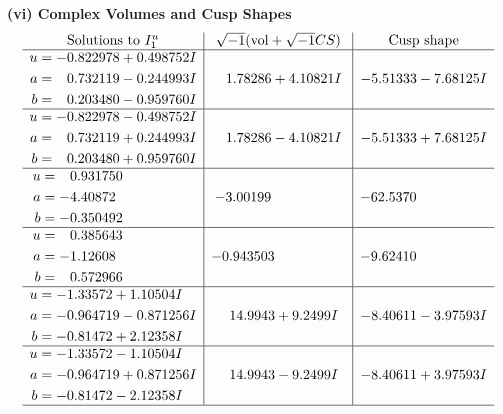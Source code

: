 \documentclass[1p]{elsarticle_modified}
\theoremstyle{definition}
\newcommand{\I}{\sqrt{-1}}
\begin{document}
\newpage\flushleft \textbf{(vi) Complex Volumes and Cusp Shapes}
$$\begin{array}{c|c|c}  
\text{Solutions to }I^u_{1}& \I (\text{vol} + \sqrt{-1}CS) & \text{Cusp shape}\\
 \hline 
\begin{aligned}
u &= -0.822978 + 0.498752 I \\
a &= \phantom{-}0.732119 - 0.244993 I \\
b &= \phantom{-}0.203480 - 0.959760 I\end{aligned}
 & \phantom{-}1.78286 + 4.10821 I & -5.51333 - 7.68125 I \\ \hline\begin{aligned}
u &= -0.822978 - 0.498752 I \\
a &= \phantom{-}0.732119 + 0.244993 I \\
b &= \phantom{-}0.203480 + 0.959760 I\end{aligned}
 & \phantom{-}1.78286 - 4.10821 I & -5.51333 + 7.68125 I \\ \hline\begin{aligned}
u &= \phantom{-}0.931750\phantom{ +0.000000I} \\
a &= -4.40872\phantom{ +0.000000I} \\
b &= -0.350492\phantom{ +0.000000I}\end{aligned}
 & -3.00199\phantom{ +0.000000I} & -62.5370\phantom{ +0.000000I} \\ \hline\begin{aligned}
u &= \phantom{-}0.385643\phantom{ +0.000000I} \\
a &= -1.12608\phantom{ +0.000000I} \\
b &= \phantom{-}0.572966\phantom{ +0.000000I}\end{aligned}
 & -0.943503\phantom{ +0.000000I} & -9.62410\phantom{ +0.000000I} \\ \hline\begin{aligned}
u &= -1.33572 + 1.10504 I \\
a &= -0.964719 - 0.871256 I \\
b &= -0.81472 + 2.12358 I\end{aligned}
 & \phantom{-}14.9943 + 9.2499 I & -8.40611 - 3.97593 I \\ \hline\begin{aligned}
u &= -1.33572 - 1.10504 I \\
a &= -0.964719 + 0.871256 I \\
b &= -0.81472 - 2.12358 I\end{aligned}
 & \phantom{-}14.9943 - 9.2499 I & -8.40611 + 3.97593 I\\
 \hline 
 \end{array}$$\newpage\newpage\renewcommand{\arraystretch}{1}
\end{document}

